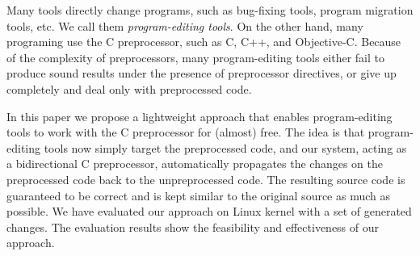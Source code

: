 
\begin{cabstract}
	\pkuthssffaq
\end{cabstract}

\begin{eabstract}
Many tools directly change programs, such as bug-fixing tools, program migration tools, etc. We call them \emph{program-editing tools}. On the other hand, many programing use the C preprocessor, such as C, C++, and Objective-C. Because of the complexity of preprocessors, many program-editing tools either fail to produce sound results under the presence of preprocessor directives, or give up completely and deal only with preprocessed code.

In this paper we propose a lightweight approach that enables program-editing tools to work with the C preprocessor for (almost) free. The idea is that program-editing tools now simply target the preprocessed code, and our system, acting as a bidirectional C preprocessor, automatically propagates the changes on the preprocessed code back to the unpreprocessed code. The resulting source code is guaranteed to be correct and is kept similar to the original source as much as possible. We have evaluated our approach on Linux kernel with a set of generated changes. The evaluation results show the feasibility and effectiveness of our approach.
\end{eabstract}

